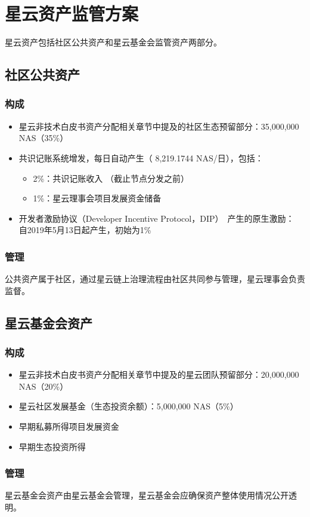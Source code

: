 \section{星云资产监管方案}

星云资产包括社区公共资产和星云基金会监管资产两部分。

\subsection{社区公共资产}

\subsubsection{构成}

\begin{itemize}
	\item 星云非技术白皮书资产分配相关章节中提及的社区生态预留部分：35,000,000 NAS（35\%）
    \item 共识记账系统增发，每日自动产生（ 8,219.1744 NAS/日），包括：
	    \begin{itemize}
			\item 2\%：共识记账收入 （截止节点分发之前）
			\item 1\%：星云理事会项目发展资金储备
		\end{itemize}
	\item 开发者激励协议（Developer Incentive Protocol，DIP）~\cite{mauvepaper}产生的原生激励： 自2019年5月13日起产生，初始为1\%
\end{itemize}

\subsubsection{管理}

公共资产属于社区，通过星云链上治理流程由社区共同参与管理，星云理事会负责监督。

\subsection{星云基金会资产}

\subsubsection{构成}

\begin{itemize}
	\item 星云非技术白皮书资产分配相关章节中提及的星云团队预留部分：20,000,000 NAS（20\%）
    \item 星云社区发展基金（生态投资余额）：5,000,000 NAS（5\%）
	\item 早期私募所得项目发展资金
	\item 早期生态投资所得
\end{itemize}

\subsubsection{管理}

星云基金会资产由星云基金会管理，星云基金会应确保资产整体使用情况公开透明。